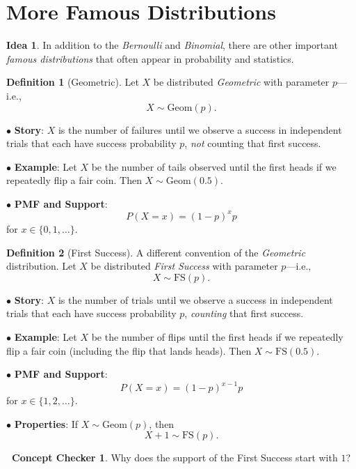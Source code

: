 \documentclass[12pt,oneside]{article}
\newcommand{\Geom}{\text{Geom}}
\newcommand{\FS}{\text{FS}}
\theoremstyle{definition}
\newtheorem{definition}{Definition}
\newtheorem{concept}{\faPen \ Concept Checker}
\newtheorem*{idea}{Idea}
\theoremstyle{remark}
\begin{document}
\section{More Famous Distributions}

\begin{idea}
In addition to the \textit{Bernoulli} and \textit{Binomial}, there are other important \textit{famous distributions} that often appear in probability and statistics.
\end{idea}

\begin{definition}[Geometric]
Let $X$ be distributed \textit{Geometric} with parameter $p$—i.e., \[X \sim \Geom(p).\]

$\bullet$ \textbf{Story}: $X$ is the number of failures until we observe a success in independent trials that each have success probability $p$, \textit{not} counting that first success.

$\bullet$ \textbf{Example}: Let $X$ be the number of tails observed until the first heads if we repeatedly flip a fair coin. Then $X \sim \Geom(0.5)$.

$\bullet$ \textbf{PMF and Support}: \[P(X = x) = (1 - p)^{x} p\] for $x \in \{0, 1, \ldots\}$.
\end{definition}

\begin{definition}[First Success]
A different convention of the \textit{Geometric} distribution. Let $X$ be distributed \textit{First Success} with parameter $p$—i.e., \[X \sim \FS(p).\]

$\bullet$ \textbf{Story}: $X$ is the number of trials until we observe a success in independent trials that each have success probability $p$, \textit{counting} that first success.

$\bullet$ \textbf{Example}: Let $X$ be the number of flips until the first heads if we repeatedly flip a fair coin (including the flip that lands heads). Then $X \sim \FS(0.5)$.

$\bullet$ \textbf{PMF and Support}: \[P(X = x) = (1 - p)^{x - 1} p\] for $x \in \{1, 2, \ldots\}$.

$\bullet$ \textbf{Properties}: If $X \sim \Geom(p)$, then \[X + 1 \sim \FS(p).\]
\end{definition}

\begin{concept}
Why does the support of the First Success start with $1$?
\end{concept}
\end{document}
